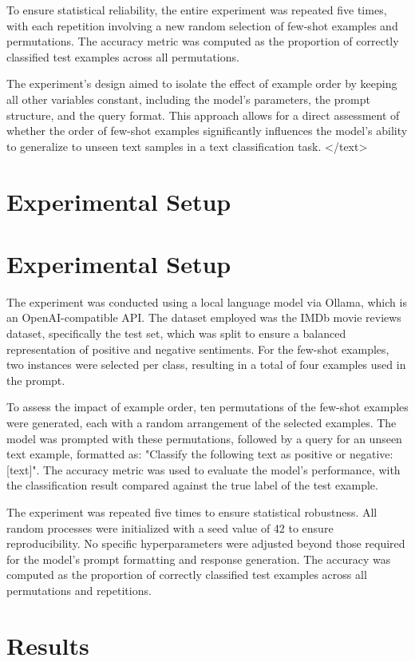\documentclass{article}
\begin{document}
To ensure statistical reliability, the entire experiment was repeated five times, with each repetition involving a new random selection of few-shot examples and permutations. The accuracy metric was computed as the proportion of correctly classified test examples across all permutations. 

The experiment's design aimed to isolate the effect of example order by keeping all other variables constant, including the model's parameters, the prompt structure, and the query format. This approach allows for a direct assessment of whether the order of few-shot examples significantly influences the model's ability to generalize to unseen text samples in a text classification task.
</text>
\section{Experimental Setup}
\section{Experimental Setup}

The experiment was conducted using a local language model via Ollama, which is an OpenAI-compatible API. The dataset employed was the IMDb movie reviews dataset, specifically the test set, which was split to ensure a balanced representation of positive and negative sentiments. For the few-shot examples, two instances were selected per class, resulting in a total of four examples used in the prompt. 

To assess the impact of example order, ten permutations of the few-shot examples were generated, each with a random arrangement of the selected examples. The model was prompted with these permutations, followed by a query for an unseen text example, formatted as: "Classify the following text as positive or negative: [text]". The accuracy metric was used to evaluate the model's performance, with the classification result compared against the true label of the test example. 

The experiment was repeated five times to ensure statistical robustness. All random processes were initialized with a seed value of 42 to ensure reproducibility. No specific hyperparameters were adjusted beyond those required for the model's prompt formatting and response generation. The accuracy was computed as the proportion of correctly classified test examples across all permutations and repetitions.
\section{Results}
\end{document}
